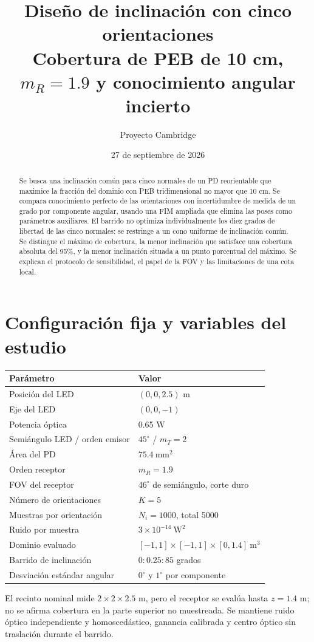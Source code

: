 \documentclass[11pt,a4paper]{article}
\title{Diseño de inclinación con cinco orientaciones\\\large Cobertura de PEB de 10 cm, $m_R=1.9$ y conocimiento angular incierto}
\author{Proyecto Cambridge}
\date{27 de septiembre de 2026}
\begin{document}
\maketitle
\begin{abstract}
Se busca una inclinación común para cinco normales de un PD reorientable que maximice la fracción del dominio con PEB tridimensional no mayor que 10 cm. Se compara conocimiento perfecto de las orientaciones con incertidumbre de medida de un grado por componente angular, usando una FIM ampliada que elimina las poses como parámetros auxiliares. El barrido no optimiza individualmente los diez grados de libertad de las cinco normales: se restringe a un cono uniforme de inclinación común. Se distingue el máximo de cobertura, la menor inclinación que satisface una cobertura absoluta del 95\%, y la menor inclinación situada a un punto porcentual del máximo. Se explican el protocolo de sensibilidad, el papel de la FOV y las limitaciones de una cota local.
\end{abstract}
\tableofcontents

\section{Configuración fija y variables del estudio}
\begin{center}
\begin{tabular}{ll}
\toprule
Parámetro & Valor \\
\midrule
Posición del LED & $(0,0,2.5)$ m \\
Eje del LED & $(0,0,-1)$ \\
Potencia óptica & 0.65 W \\
Semiángulo LED / orden emisor & $45^\circ$ / $m_T=2$ \\
Área del PD & $75.4\ \mathrm{mm}^2$ \\
Orden receptor & $m_R=1.9$ \\
FOV del receptor & $46^\circ$ de semiángulo, corte duro \\
Número de orientaciones & $K=5$ \\
Muestras por orientación & $N_i=1000$, total 5000 \\
Ruido por muestra & $3\times10^{-14}\ \mathrm W^2$ \\
Dominio evaluado & $[-1,1]\times[-1,1]\times[0,1.4]\ \mathrm m^3$ \\
Barrido de inclinación & $0:0.25:85$ grados \\
Desviación estándar angular & $0^\circ$ y $1^\circ$ por componente \\
\bottomrule
\end{tabular}
\end{center}
El recinto nominal mide $2\times2\times2.5$ m, pero el receptor se evalúa hasta $z=1.4$ m; no se afirma cobertura en la parte superior no muestreada. Se mantiene ruido óptico independiente y homoscedástico, ganancia calibrada y centro óptico sin traslación durante el barrido.
\end{document}
